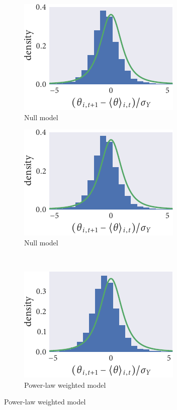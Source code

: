 \begin{figure}
  \begin{subfigure}[b]{0.33333\textwidth}
    \caption{Null model}
    \includegraphics{seq3/null_residuals.pdf}
  \end{subfigure}\hspace{2pt}
  \begin{subfigure}[b]{0.33333\textwidth}
    \caption{Null model}
    \includegraphics{seq3/null_residuals.pdf}
  \end{subfigure}\vspace{1em}\\
  \begin{subfigure}[b]{0.33333\textwidth}
    \includegraphics{seq3/power_residuals.pdf}
    \caption{Power-law weighted model}

\end{subfigure}
\end{figure}
